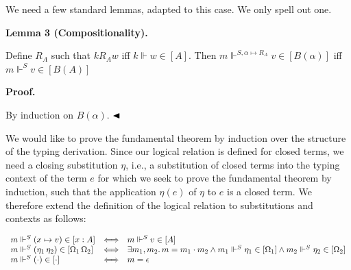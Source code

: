  
 
We need a few standard lemmas, adapted to this case. We only spell out one.\par
 
 
 
\par\medskip\noindent\textbf{Lemma 3 (Compositionality).}\par
 
 
Define $R_{A}$ such that $k\mathrel{R_{A}}w$ iff $k\Vdash w\in[A]$. Then $m\Vdash^{S,\alpha\mapsto R_{A}}v\in[B(\alpha)]$ iff $m\Vdash^{S}v\in[B(A)]$\par
 
 
 
 
\par\medskip\noindent\textbf{Proof.}\par
 
 
By induction on $B(\alpha)$. $\hfill\blacktriangleleft$\par
 
 
 
We would like to prove the fundamental theorem by induction over the structure of the typing derivation. Since our logical relation is defined for closed terms, we need a closing substitution $\eta$, i.e., a substitution of closed terms into the typing context of the term $e$ for which we seek to prove the fundamental theorem by induction, such that the application $\eta(e)$ of $\eta$ to $e$ is a closed term. We therefore extend the definition of the logical relation to substitutions and contexts as follows:\par
 
 
  
\par  \quad  \[\begin{array}[]{lcl}m\Vdash^{S}(x\mapsto v)\in[x:A]&\Longleftrightarrow&m\Vdash^{S}v\in[A]\\
m\Vdash^{S}(\eta_{1}\,\eta_{2})\in[\Omega_{1}\,\Omega_{2}]&\Longleftrightarrow&\exists m_{1},m_{2}.\,m=m_{1}\cdot m_{2}\land m_{1}\Vdash^{S}\eta_{1}\in[\Omega_{1}]\land m_{2}\Vdash^{S}\eta_{2}\in[\Omega_{2}]\\
m\Vdash^{S}(\cdot)\in[\cdot]&\Longleftrightarrow&m=\epsilon\end{array}\]\quad  \quad  
  
